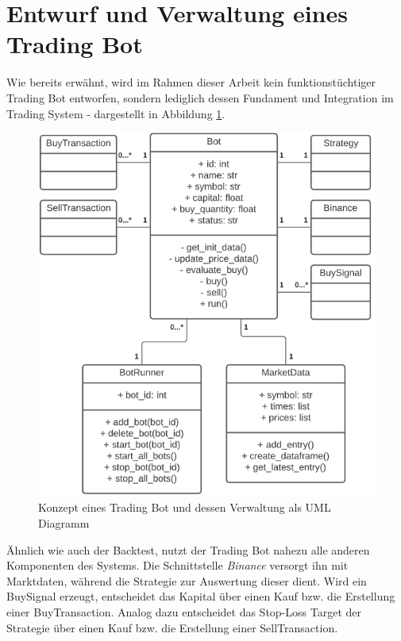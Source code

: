 \documentclass[oneside]{ausarbeitung}
\begin{document}

\section{Entwurf und Verwaltung eines Trading Bot}
\label{sec:schnittstelle_für_handelsplattformen}

Wie bereits erwähnt, wird im Rahmen dieser Arbeit kein funktionstüchtiger Trading Bot entworfen, sondern lediglich dessen Fundament und Integration im Trading System - dargestellt in Abbildung \ref{fig:14}.

\begin{figure}[H]
  \centering
  \includegraphics[height=0.65\textheight]{uml/bot_uml.png}
  \caption{Konzept eines Trading Bot und dessen Verwaltung als UML Diagramm}
  \label{fig:14}
\end{figure}

Ähnlich wie auch der Backtest, nutzt der Trading Bot nahezu alle anderen Komponenten des Systems. Die Schnittstelle \textit{Binance} versorgt ihn mit Marktdaten, während die Strategie zur Auswertung dieser dient. Wird ein BuySignal erzeugt, entscheidet das Kapital über einen Kauf bzw. die Erstellung einer BuyTransaction. Analog dazu entscheidet das Stop-Loss Target der Strategie über einen Kauf bzw. die Erstellung einer SellTransaction.
\end{document}
